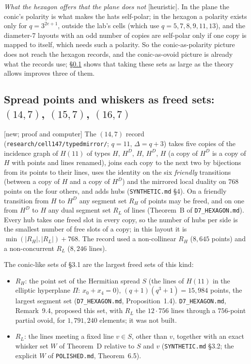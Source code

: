 \documentclass[11pt]{amsart}
\theoremstyle{definition}
\theoremstyle{remark}
\newcommand{\status}[1]{\textup{[#1]}}
\begin{document}
\emph{What the hexagon offers that the plane does not} \status{heuristic}. In the plane the conic's polarity is what
makes the hats self-polar; in the hexagon a polarity exists only for $q=3^{2e+1}$, outside the lab's cells (which
use $q=5,7,8,9,11,13$), and the diameter-$7$ layouts with an odd number of copies are self-polar only if one copy is
mapped to itself, which needs such a polarity. So the conic-as-polarity picture does not reach the hexagon records,
and the conic-as-ovoid picture is already what the records use; \S\ref{ssec:d14} shows that taking these sets as large
as the theory allows improves three of them.

\subsection{Spread points and whiskers as freed sets: $(14,7)$, $(15,7)$, $(16,7)$}\label{ssec:d14}
\status{new; proof and computer} The $(14,7)$ record (\texttt{research/cell147/typedmirror/}; $q=11$, $\Delta=q+3$)
takes five copies of the incidence graph of $H(11)$ of types $H$, $H^D$, $H$, $H^D$, $H$ (a copy of $H^D$ is a copy of
$H$ with points and lines renamed), joins each copy to the next two by bijections from its points to their lines, uses
the identity on the six \emph{friendly} transitions (between a copy of $H$ and a copy of $H^D$) and the mirrored local
duality on $768$ points on the four others, and adds hubs (\texttt{SYNTHETIC.md} \S4). On a friendly transition from
$H$ to $H^D$ any segment set $R_H$ of points may be freed, and on one from $H^D$ to $H$ any dual segment set $R_L$ of
lines (Theorem~B of \texttt{D7\_HEXAGON.md}). Every hub takes one freed slot in every copy, so the number of hubs per
side is the smallest number of free slots of a copy; in this layout it is $\min(|R_H|,|R_L|)+768$. The record used a
non-collinear $R_H$ ($8{,}645$ points) and a non-concurrent $R_L$ ($8{,}246$ lines).

The conic-like sets of \S3.1 are the largest freed sets of this kind:
\begin{itemize}
\item $R_H$: the point set of the Hermitian spread $S$ (the lines of $H(11)$ in the elliptic hyperplane $\Pi$:
$x_0+x_4=0$), $(q+1)(q^3+1)=15{,}984$ points, the largest segment set (\texttt{D7\_HEXAGON.md}, Proposition~1.4).
\texttt{D7\_HEXAGON.md}, Remark~9.4, proposed this set, with $R_L$ the $12\cdot756$ lines through a $756$-point partial
ovoid, for $1{,}791{,}240$ elements; it was not built.
\item $R_L$: the lines meeting a fixed line $v\in S$, other than $v$, together with an exact whisker set $W$ of
Theorem~D relative to $S$ and $v$ (\texttt{SYNTHETIC.md} \S3.2; the explicit $W$ of \texttt{POLISHED.md}, Theorem~6.5).
\end{itemize}
\end{document}
